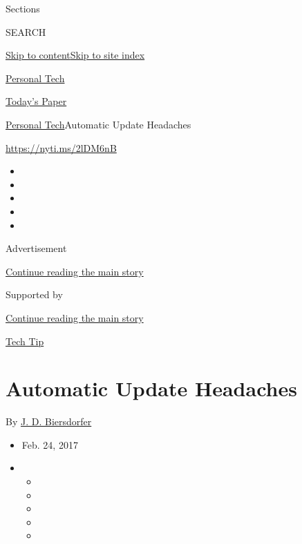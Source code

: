 Sections

SEARCH

\protect\hyperlink{site-content}{Skip to
content}\protect\hyperlink{site-index}{Skip to site index}

\href{https://www.nytimes.com/section/technology/personaltech}{Personal
Tech}

\href{https://myaccount.nytimes.com/auth/login?response_type=cookie\&client_id=vi}{}

\href{https://www.nytimes.com/section/todayspaper}{Today's Paper}

\href{/section/technology/personaltech}{Personal
Tech}\textbar{}Automatic Update Headaches

\url{https://nyti.ms/2lDM6nB}

\begin{itemize}
\item
\item
\item
\item
\item
\end{itemize}

Advertisement

\protect\hyperlink{after-top}{Continue reading the main story}

Supported by

\protect\hyperlink{after-sponsor}{Continue reading the main story}

\href{/column/tech-tip}{Tech Tip}

\hypertarget{automatic-update-headaches}{%
\section{Automatic Update Headaches}\label{automatic-update-headaches}}

By \href{http://www.nytimes.com/by/j-d-biersdorfer}{J. D. Biersdorfer}

\begin{itemize}
\item
  Feb. 24, 2017
\item
  \begin{itemize}
  \item
  \item
  \item
  \item
  \item
  \end{itemize}
\end{itemize}

